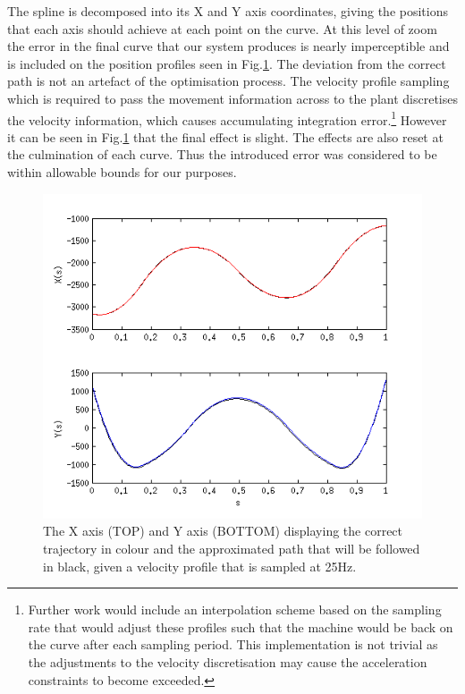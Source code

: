 The spline is decomposed into its X and Y axis coordinates, giving the positions that each axis should achieve at each point on the curve. At this level of zoom the error in the final curve that our system produces is nearly imperceptible and is included on the position profiles seen in Fig.\ref{fig:xy_s}. The deviation from the correct path is not an artefact of the optimisation process. The velocity profile sampling which is required to pass the movement information across to the plant discretises the velocity information, which causes accumulating integration error.\footnote{Further work would include an interpolation scheme based on the sampling rate that would adjust these profiles such that the machine would be back on the curve after each sampling period. This implementation is not trivial as the adjustments to the velocity discretisation may cause the acceleration constraints to become exceeded.} However it can be seen in Fig.\ref{fig:xy_s} that the final effect is slight. The effects are also reset at the culmination of each curve. Thus the introduced error was considered to be within allowable bounds for our purposes.

\begin{figure}  
\includegraphics[width=\textwidth]{figures/optimisation/xy_s.png}
\caption[Indexed curve position and theoretical final path]{
The X axis (TOP) and Y axis (BOTTOM) displaying the correct trajectory in colour and the approximated path that will be followed in black, given a velocity profile that is sampled at 25Hz.
\label{fig:xy_s}}
\end{figure} 

